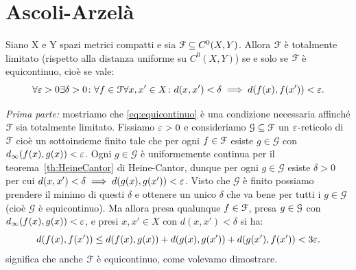 \section{Ascoli-Arzelà}

\begin{theorem}
Siano X e Y spazi metrici compatti e sia $\mathcal F\subseteq C^0(X,Y)$.
Allora $\mathcal F$ è totalmente limitato (rispetto alla distanza uniforme su $C^0(X,Y)$) 
se e solo se $\mathcal F$ è equicontinuo, cioè se vale:
\begin{equation}\label{eq:equicontinuo}
  \forall \varepsilon>0 \exists \delta >0\colon \forall f\in \mathcal F \forall x,x'\in X\colon
   d(x,x') < \delta \implies d(f(x),f(x')) < \varepsilon.
\end{equation}
\end{theorem}
\begin{theorem}
\emph{Prima parte:} mostriamo che \eqref{eq:equicontinuo} è una condizione necessaria 
affinché $\mathcal F$ sia totalmente limitato.
Fissiamo $\varepsilon>0$ e consideriamo $\mathcal G\subseteq \mathcal F$ un $\varepsilon$-reticolo di $\mathcal F$
cioè un sottoinsieme finito tale che per ogni $f\in \mathcal F$ esiste $g\in \mathcal G$ 
con $d_\infty(f(x), g(x)) < \varepsilon$.
Ogni $g\in \mathcal G$ è uniformemente continua per il teorema~\ref{th:HeineCantor} di Heine-Cantor,
dunque per ogni $g\in \mathcal G$ esiste $\delta>0$ per cui $d(x,x')<\delta \implies d(g(x),g(x'))<\varepsilon$.
Visto che $\mathcal G$ è finito possiamo prendere il minimo di questi $\delta$ e ottenere un 
unico $\delta$ che va bene per tutti i $g\in \mathcal G$ (cioè $\mathcal G$ è equicontinuo).
Ma allora presa qualunque $f\in \mathcal F$, presa $g\in \mathcal G$ con $d_\infty(f(x), g(x)) < \varepsilon$, 
e presi $x,x'\in X$ con $d(x,x')<\delta$ si ha:
\[
  d(f(x), f(x')) 
    \le d(f(x), g(x)) + d(g(x), g(x')) + d(g(x'), f(x')) < 3\varepsilon.
\]
significa che anche $\mathcal F$ è equicontinuo, come volevamo dimostrare.


\end{theorem}
